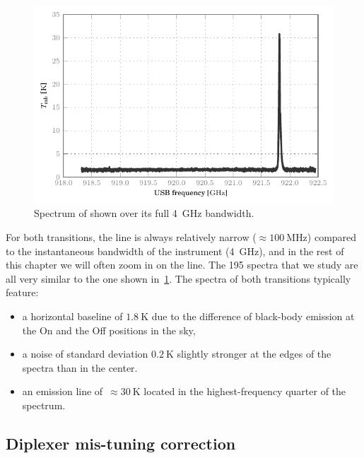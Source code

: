 \begin{figure}
    \centering
    \includegraphics{87_00_00_tmb}
    \caption{
        Spectrum of  shown over its full \SI{4}{\giga\hertz} bandwidth.
    }
    \label{fig:co98_full_bandwidth}
\end{figure}

For both transitions, the  line is always relatively narrow ($\approx \SI{100}{\mega\hertz}$) compared to the instantaneous bandwidth of the instrument (\SI{4}{\giga\hertz}), and in the rest of this chapter we will often zoom in on the line.
The 195 spectra that we study are all very similar to the one shown in~\cref{fig:co98_full_bandwidth}.
The spectra of both transitions typically feature:
\begin{itemize}
    \item a horizontal baseline of $\SI{1.8}{\kelvin}$ due to the difference of black-body emission at the On and the Off positions in the sky,
    \item a noise of standard deviation $\SI{0.2}{\kelvin}$ slightly stronger at the edges of the spectra than in the center.
    \item an emission line of~$\approx \SI{30}{\kelvin}$ located in the highest-frequency quarter of the spectrum.
\end{itemize}




\subsection{Diplexer mis-tuning correction}

